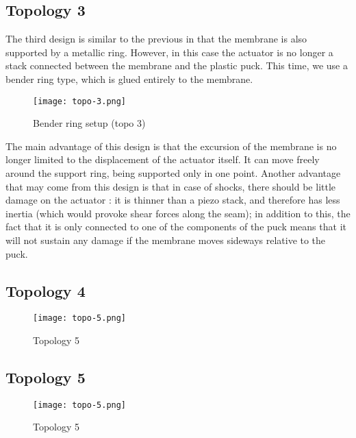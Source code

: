 \subsection{Topology 3}

The third design is similar to the previous in that the membrane is also
supported by a metallic ring. However, in this case the actuator is no longer a
stack connected between the membrane and the plastic puck. This time, we use a
bender ring type, which is glued entirely to the membrane.

\begin{figure}[h]
  \begin{center}
    \texttt{[image: topo-3.png]}
  \end{center}
  \caption{Bender ring setup (topo 3)}
  \label{fig:topo-3}
\end{figure}

The main advantage of this design is that the excursion of the membrane is no
longer limited to the displacement of the actuator itself. It can move freely
around the support ring, being supported only in one point. Another advantage
that may come from this design is that in case of shocks, there should be little
damage on the actuator : it is thinner than a piezo stack, and therefore has
less inertia (which would provoke shear forces along the seam); in addition to
this, the fact that it is only connected to one of the components of the puck
means that it will not sustain any damage if the membrane moves sideways
relative to the puck.


\subsection{Topology 4}

\begin{figure}[h]
  \begin{center}
    \texttt{[image: topo-5.png]}
  \end{center}
  \caption{Topology 5}
  \label{fig:topo-5}
\end{figure}

\subsection{Topology 5}

\begin{figure}[h]
  \begin{center}
    \texttt{[image: topo-5.png]}
  \end{center}
  \caption{Topology 5}
  \label{fig:topo-5}
\end{figure}


